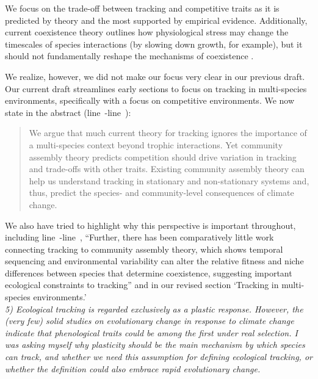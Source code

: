 \documentclass[11pt]{article}
\newcommand{\lr}[1]{line~\lineref{#1}}
\begin{document}
We focus on the trade-off between tracking and competitive traits as it is predicted by theory and the most supported by empirical evidence. Additionally, current coexistence theory outlines how physiological stress may change the timescales of species interactions (by slowing down growth, for example), but it should not fundamentally reshape the mechanisms of coexistence \citep{Chesson:1997dz}.

We realize, however, we did not make our focus very clear in our previous draft. Our current draft streamlines early sections to focus on tracking in multi-species environments, specifically with a focus on competitive environments. We now state in the abstract (\lr{r3misc1}-\lr{endabs}):
\begin{quote}
We argue that much current theory for tracking ignores the importance of a multi-species context beyond trophic interactions. Yet community assembly theory predicts competition should drive variation in tracking and trade-offs with other traits. Existing community assembly theory can help us understand tracking in stationary and non-stationary systems and, thus, predict the species- and community-level consequences of climate change.
\end{quote}
We also have tried to highlight why this perspective is important throughout, including \lr{r1more}-\lr{r3misc3}, ``Further, there has been comparatively little work connecting tracking to community assembly theory, which shows temporal sequencing and environmental variability can alter the relative fitness and niche differences between species that determine coexistence, suggesting important ecological constraints to tracking'' and in our revised section `Tracking in multi-species environments.'\\

\emph{5) Ecological tracking is regarded exclusively as a plastic response. However, the (very few)
solid studies on evolutionary change in response to climate change indicate that phenological
traits could be among the first under real selection. I was asking myself why plasticity
should be the main mechanism by which species can track, and whether we need this assumption
for defining ecological tracking, or whether the definition could also embrace rapid
evolutionary change.}\\
\end{document}
